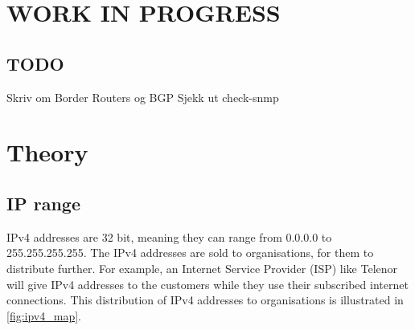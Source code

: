 \section{WORK IN PROGRESS} \label{sec:new}
\subsection{TODO}

Skriv om Border Routers og BGP
Sjekk ut check-snmp

\section{Theory}

\subsection{IP range}
IPv4 addresses are 32 bit, meaning they can range from 0.0.0.0 to 255.255.255.255. The IPv4 addresses are sold to organisations, for them to distribute further. For example, an Internet Service Provider (ISP) like Telenor will give IPv4 addresses to the customers while they use their subscribed internet connections. This distribution of IPv4 addresses to organisations is illustrated in \cref{fig:ipv4_map}.


